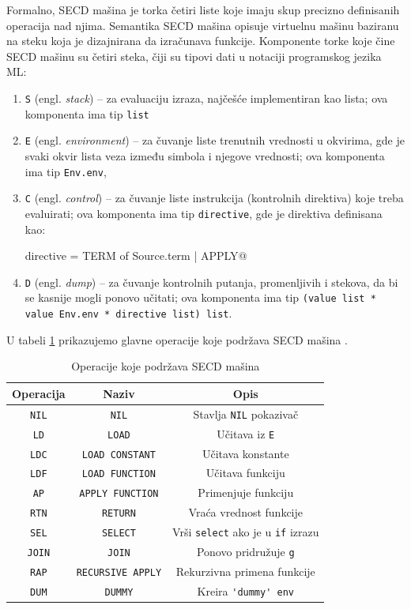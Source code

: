\documentclass[a4paper]{article}
\begin{document}
Formalno, SECD mašina je torka četiri liste koje imaju skup precizno definisanih operacija nad njima. Semantika SECD mašina opisuje virtuelnu mašinu baziranu na steku koja je dizajnirana da izračunava funkcije. Komponente torke koje čine SECD mašinu su četiri steka, čiji su tipovi dati u notaciji programskog jezika ML:
\begin{enumerate}
	\item \verb|S| (engl. \textit{stack}) -- za evaluaciju izraza, najčešće implementiran kao lista; ova komponenta ima tip \verb|list|  
	\item \verb|E| (engl. \textit{environment}) -- za čuvanje liste trenutnih vrednosti u okvirima, gde je svaki okvir lista veza između simbola i njegove vrednosti; ova komponenta ima tip \verb|Env.env|,
	\item \verb|C| (engl. \textit{control}) -- za čuvanje liste instrukcija (kontrolnih direktiva) koje treba evaluirati; ova komponenta ima tip \verb|directive|, gde je direktiva definisana kao:
	\begin{center}
		\verb@datatype directive = TERM of Source.term | APPLY@
	\end{center}
	\item \verb|D| (engl. \textit{dump}) -- za čuvanje kontrolnih putanja, promenljivih i stekova, da bi se kasnije mogli ponovo učitati; ova komponenta ima tip \verb|(value list * value Env.env * directive list) list|.
\end{enumerate}

U tabeli \ref{tab:tabelaInstr} prikazujemo glavne operacije koje podržava SECD mašina \cite{introduction-fp-systems}.

\begin{table}[h!]
	\centering
	\label{tab:tabelaInstr}
	\caption{Operacije koje podržava SECD mašina}
	\begin{tabular}{|c|c|c|} \hline
		Operacija&Naziv&Opis\\ \hline
		\verb|NIL| & \verb|NIL| & Stavlja \verb|NIL| pokazivač\\ \hline
		\verb|LD| & \verb|LOAD| & Učitava iz \verb|E| \\ \hline
		\verb|LDC| & \verb|LOAD CONSTANT| & Učitava konstante\\ \hline
		\verb|LDF| & \verb|LOAD FUNCTION| & Učitava funkciju \\ \hline
		\verb|AP| & \verb|APPLY FUNCTION| & Primenjuje funkciju\\ \hline
		\verb|RTN| & \verb|RETURN| & Vraća vrednost funkcije \\ \hline
		\verb|SEL| & \verb|SELECT| & Vrši \verb|select| ako je u \verb|if| izrazu\\ \hline
		\verb|JOIN| & \verb|JOIN| & Ponovo pridružuje \verb|g|\\ \hline
		\verb|RAP| & \verb|RECURSIVE APPLY| & Rekurzivna primena funkcije\\ \hline
		\verb|DUM| & \verb|DUMMY| & Kreira \verb|'dummy' env| \\ \hline
	\end{tabular}
\end{table}
\end{document}

